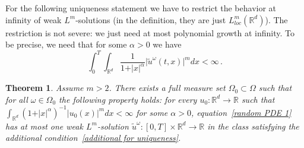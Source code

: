 \documentclass[a4paper,10pt]{article}
\newtheorem{theorem}{Theorem}
\begin{document}
For the following uniqueness statement we have to restrict the behavior at
infinity of weak $L^{m}$-solutions (in the definition, they are just
$L_{loc}^{m}(  \mathbb{R}^{d})  $). The restriction is not severe:
we just need at most polynomial growth at infinity. To be precise, we need
that for some $\alpha>0$ we have
\begin{equation}
\int_{0}^{T}\int_{\mathbb{R}^{d}}\frac{1}{1+ \vert x \vert^{\alpha}} \vert \widetilde{u}^\omega(t,x) \vert^{m}dx<\infty \,.\label{additional for uniqueness}
\end{equation}

\begin{theorem}\label{pathbypath uniq SPDE}
Assume $m>2$. There exists a full measure set $\Omega
_{0}\subset\Omega$ such that for all $\omega\in\Omega_{0}$ the following
property holds: for every $u_{0} \colon \mathbb{R}^{d}\rightarrow\mathbb{R}$ such
that $\int_{\mathbb{R}^{d}} (1+ \vert x \vert^{\alpha})^{-1} \vert u_{0}(x) \vert^{m}dx<\infty$ for some
$\alpha>0$, equation~\eqref{random PDE 1} has at most one weak $L^{m} 
$-solution $\widetilde{u}^\omega \colon [0,T] \times \mathbb{R}^{d}\rightarrow\mathbb{R}$ in the class satisfying the additional condition~\eqref{additional for uniqueness}.
\end{theorem}
\end{document}

